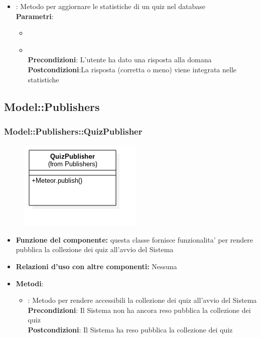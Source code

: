 \begin{itemize}
\begin{itemize}
	\item{} : Metodo per aggiornare le statistiche di un quiz nel database\\
	\textbf{Parametri}:
	\begin{itemize}
		\item{}\\
		\item{}\\
		\textbf{Precondizioni}: L'utente ha dato una risposta alla domana\\
		\textbf{Postcondizioni}:La risposta (corretta o meno) viene integrata nelle statistiche\\
	\end{itemize}
\end{itemize}
\end{itemize}
\newpage

\subsection{Model::Publishers}
\subsubsection{Model::Publishers::QuizPublisher}
\begin{figure}[h!]
\begin{center}
	\includegraphics[scale=0.4]{../images/Model/Publishers/QuizPublisher.png}
\end{center}
\end{figure}
\begin{itemize}
\item\textbf{Funzione del componente:} questa classe fornisce funzionalita' per rendere pubblica la collezione dei quiz all'avvio del Sistema
\item\textbf{Relazioni d'uso con altre componenti:} Nessuna \\
\item\textbf{Metodi}:
	\begin{itemize}
		\item{} : Metodo per rendere accessibili la collezione dei quiz all'avvio del Sistema\\
		\textbf{Precondizioni}: Il Sistema non ha ancora reso pubblica la collezione dei quiz\\
		\textbf{Postcondizioni}: Il Sistema ha reso pubblica la collezione dei quiz\\
	\end{itemize}
\end{itemize}
\newpage

